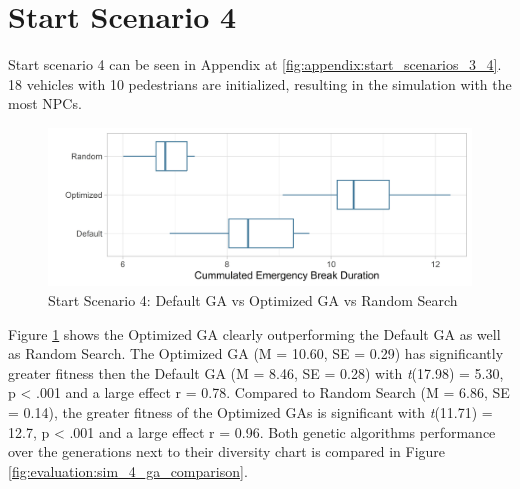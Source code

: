 \section{Start Scenario 4}
Start scenario 4 can be seen in Appendix at \ref{fig:appendix:start_scenarios_3_4}. 18 vehicles with 10 pedestrians are initialized, resulting in the simulation with the most NPCs.

\begin{figure}[ht] 
	\label{fig:evaluation:sim_4_comparison}
	\includegraphics[width=1\linewidth]{simulations/evaluation/plots/sim_4_comparison}
	\caption{Start Scenario 4: Default GA vs Optimized GA vs Random Search}
\end{figure}

Figure \ref{fig:evaluation:sim_4_comparison} shows the Optimized GA clearly outperforming the Default GA as well as Random Search.
The Optimized GA (M = 10.60, SE = 0.29) has significantly greater fitness then the Default GA (M = 8.46, SE = 0.28) with \textit{t}(17.98) = 5.30, p < .001 and a large effect r = 0.78.
Compared to Random Search (M = 6.86, SE = 0.14), the greater fitness of the Optimized GAs is significant with \textit{t}(11.71) = 12.7, p < .001 and a large effect r = 0.96. Both genetic algorithms performance over the generations next to their diversity chart is compared in Figure \ref{fig:evaluation:sim_4_ga_comparison}.

